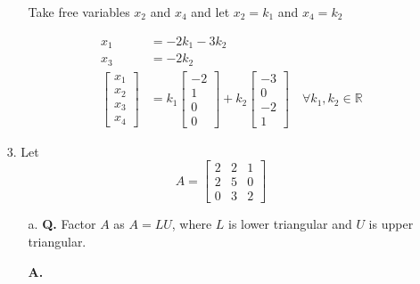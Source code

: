 \documentclass[main.tex]{subfiles}
\begin{document}
\begin{enumerate}
\begin{enumerate}
    Take free variables $x_2$ and $x_4$ and let $x_2=k_1$ and $x_4 = k_2$
    
    $$
    \begin{aligned}
    x_1 &= -2k_1 - 3k_2\\
    x_3 &= -2k_2\\
    \left[\begin{array}{c}
    x_{1} \\
    x_{2} \\
    x_{3} \\
    x_{4}
    \end{array}\right]&=k_{1}\left[\begin{array}{c}
    -2 \\
    1 \\
    0 \\
    0
    \end{array}\right]+k_{2}\left[\begin{array}{c}
    -3 \\
    0 \\
    -2 \\
    1
    \end{array}\right] \quad \forall k_1,k_2 \in \mathbb{R}
    \end{aligned}
    $$

\end{enumerate}

\item[3.] Let
$$
A=\left[\begin{array}{lll}
2 & 2 & 1 \\
2 & 5 & 0 \\
0 & 3 & 2
\end{array}\right]
$$
\begin{enumerate}
    \item [a.] \textbf{Q.} Factor $A$ as $A=L U$, where $L$ is lower triangular and $U$ is upper triangular. 
    
    \textbf{A.} 
    

\end{enumerate}
\end{enumerate}
\end{document}
